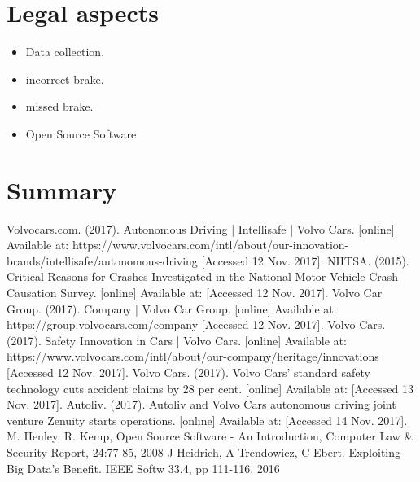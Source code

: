 \documentclass[conference]{IEEEtran}
\begin{document}
\section{Legal aspects}
\begin{itemize}
	\item Data collection.
	\item incorrect brake.
	\item missed brake.
	\item Open Source Software
\end{itemize}

\section{Summary}

\begin{thebibliography}{00}
	 Volvocars.com. (2017). Autonomous Driving | Intellisafe | Volvo Cars. [online] Available at: https://www.volvocars.com/intl/about/our-innovation-brands/intellisafe/autonomous-driving [Accessed 12 Nov. 2017].
	 NHTSA. (2015). Critical Reasons for Crashes Investigated in the National Motor Vehicle Crash Causation Survey. [online] Available at:  [Accessed 12 Nov. 2017].
	 Volvo Car Group. (2017). Company | Volvo Car Group. [online] Available at: https://group.volvocars.com/company [Accessed 12 Nov. 2017].
	 Volvo Cars. (2017). Safety Innovation in Cars | Volvo Cars. [online] Available at: https://www.volvocars.com/intl/about/our-company/heritage/innovations [Accessed 12 Nov. 2017].
	 Volvo Cars. (2017). Volvo Cars' standard safety technology cuts accident claims by 28 per cent. [online] Available at:  [Accessed 13 Nov. 2017].
	 Autoliv. (2017). Autoliv and Volvo Cars autonomous driving joint venture Zenuity starts operations. [online] Available at:  [Accessed 14 Nov. 2017].
	 M. Henley, R. Kemp, Open Source Software - An Introduction, Computer Law \& Security Report, 24:77-85, 2008
	 J Heidrich, A Trendowicz, C Ebert. Exploiting Big Data's Benefit. IEEE Softw 33.4, pp 111-116. 2016

\end{thebibliography}
\end{document}
